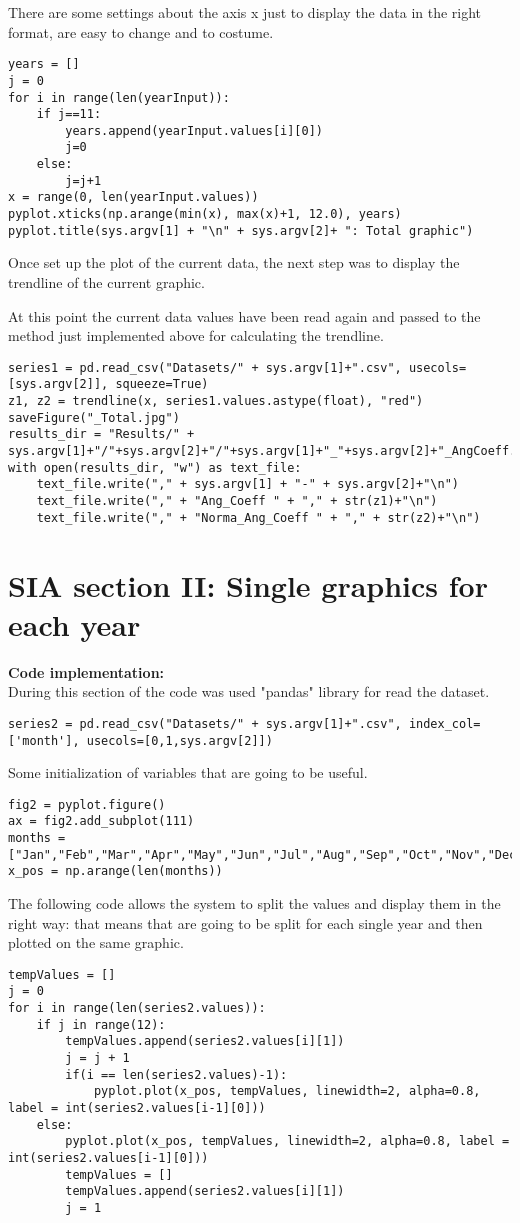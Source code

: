 There are some settings about the axis x just to display the data in the right format, are easy to change and to costume.
\begin{lstlisting}
years = []
j = 0
for i in range(len(yearInput)):
    if j==11:
        years.append(yearInput.values[i][0])
        j=0
    else:
        j=j+1 
x = range(0, len(yearInput.values))
pyplot.xticks(np.arange(min(x), max(x)+1, 12.0), years)
pyplot.title(sys.argv[1] + "\n" + sys.argv[2]+ ": Total graphic")
\end{lstlisting}

Once set up the plot of the current data, the next step was to display the trendline of the current graphic.

At this point the current data values have been read again and passed to the method just implemented above for calculating the trendline.
\begin{lstlisting}
series1 = pd.read_csv("Datasets/" + sys.argv[1]+".csv", usecols=[sys.argv[2]], squeeze=True)
z1, z2 = trendline(x, series1.values.astype(float), "red")
saveFigure("_Total.jpg")
results_dir = "Results/" + sys.argv[1]+"/"+sys.argv[2]+"/"+sys.argv[1]+"_"+sys.argv[2]+"_AngCoeff.csv"
with open(results_dir, "w") as text_file:
	text_file.write("," + sys.argv[1] + "-" + sys.argv[2]+"\n")
	text_file.write("," + "Ang_Coeff " + "," + str(z1)+"\n")
	text_file.write("," + "Norma_Ang_Coeff " + "," + str(z2)+"\n")
\end{lstlisting}

\section{SIA section II: Single graphics for each year}
\label{SIA_section_II}
\textbf{Code implementation:}\\
During this section of the code was used "pandas" library for read the dataset.
\begin{lstlisting}
series2 = pd.read_csv("Datasets/" + sys.argv[1]+".csv", index_col=['month'], usecols=[0,1,sys.argv[2]])
\end{lstlisting}

Some initialization of variables that are going to be useful.
\begin{lstlisting}
fig2 = pyplot.figure()
ax = fig2.add_subplot(111)
months = ["Jan","Feb","Mar","Apr","May","Jun","Jul","Aug","Sep","Oct","Nov","Dec"]
x_pos = np.arange(len(months))
\end{lstlisting}

The following code allows the system to split the values and display them in the right way: that means that are going to be split for each single year and then plotted on the same graphic.
\begin{lstlisting}
tempValues = []
j = 0
for i in range(len(series2.values)):
	if j in range(12):
		tempValues.append(series2.values[i][1])
		j = j + 1
		if(i == len(series2.values)-1):
			pyplot.plot(x_pos, tempValues, linewidth=2, alpha=0.8, label = int(series2.values[i-1][0]))
	else:
		pyplot.plot(x_pos, tempValues, linewidth=2, alpha=0.8, label = int(series2.values[i-1][0]))
		tempValues = []
		tempValues.append(series2.values[i][1])
		j = 1
\end{lstlisting}

